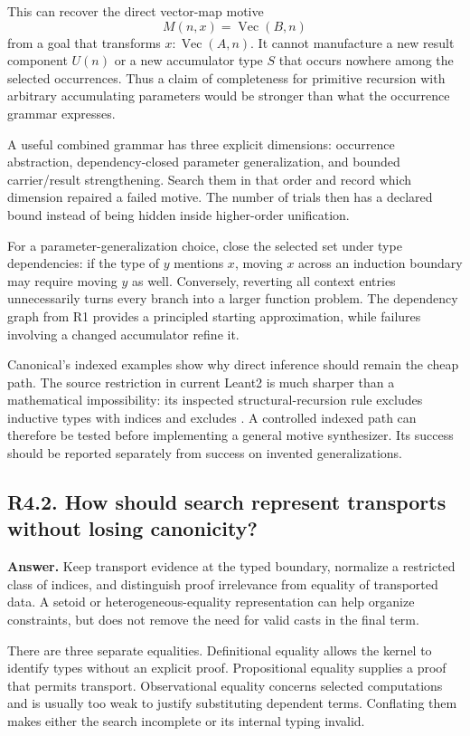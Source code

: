 \documentclass[11pt,a4paper]{article}
\newcommand{\code}[1]{\texttt{\detokenize{#1}}}
\newcommand{\question}[2]{\subsection{#1. #2}\label{q:#1}}
\theoremstyle{definition}
\theoremstyle{remark}
\begin{document}
This can recover the direct vector-map motive
\[
 M(n,x)=\operatorname{Vec}(B,n)
\]
from a goal that transforms $x:\operatorname{Vec}(A,n)$. It cannot manufacture a new result component $U(n)$ or a new accumulator type $S$ that occurs nowhere among the selected occurrences. Thus a claim of completeness for primitive recursion with arbitrary accumulating parameters would be stronger than what the occurrence grammar expresses.

A useful combined grammar has three explicit dimensions: occurrence abstraction, dependency-closed parameter generalization, and bounded carrier/result strengthening. Search them in that order and record which dimension repaired a failed motive. The number of trials then has a declared bound instead of being hidden inside higher-order unification.

For a parameter-generalization choice, close the selected set under type dependencies: if the type of $y$ mentions $x$, moving $x$ across an induction boundary may require moving $y$ as well. Conversely, reverting all context entries unnecessarily turns every branch into a larger function problem. The dependency graph from R1 provides a principled starting approximation, while failures involving a changed accumulator refine it.

Canonical's indexed examples show why direct inference should remain the cheap path.\cite{canonical} The source restriction in current Leant2 is much sharper than a mathematical impossibility: its inspected structural-recursion rule excludes inductive types with indices and excludes \code{Nat}.\cite{repo-search} A controlled indexed path can therefore be tested before implementing a general motive synthesizer. Its success should be reported separately from success on invented generalizations.

\question{R4.2}{How should search represent transports without losing canonicity?}

\textbf{Answer.} Keep transport evidence at the typed boundary, normalize a restricted class of indices, and distinguish proof irrelevance from equality of transported data. A setoid or heterogeneous-equality representation can help organize constraints, but does not remove the need for valid casts in the final term.

There are three separate equalities. Definitional equality allows the kernel to identify types without an explicit proof. Propositional equality supplies a proof that permits transport. Observational equality concerns selected computations and is usually too weak to justify substituting dependent terms. Conflating them makes either the search incomplete or its internal typing invalid.
\end{document}
